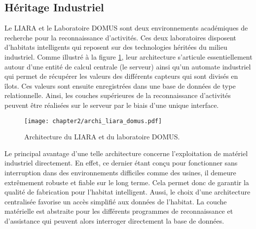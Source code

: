 \subsection{Héritage Industriel}

Le \acs{LIARA} \citep{Bouchard2014} et le Laboratoire \acs{DOMUS} \citep{Giroux2009} sont deux environnements académiques de recherche pour la reconnaissance d'activités. Ces deux laboratoires disposent d'habitats intelligents qui reposent sur des technologies héritées du milieu industriel. Comme illustré à la figure \ref{fig:archi_liara_domus}, leur architecture s'articule essentiellement autour d'une entité de calcul centrale (le serveur) ainsi qu'un automate industriel qui permet de récupérer les valeurs des différents capteurs qui sont divisés en îlots. Ces valeurs sont ensuite enregistrées dans une base de données de type relationnelle. Ainsi, les couches supérieures de la reconnaissance d'activités peuvent être réalisées sur le serveur par le biais d'une unique interface.

\begin{figure}[t]
	\centering
	\texttt{[image: chapter2/archi\_liara\_domus.pdf]}
	\caption{Architecture du \acs{LIARA} et du laboratoire \acs{DOMUS}.}
	\label{fig:archi_liara_domus}
\end{figure}

Le principal avantage d'une telle architecture concerne l'exploitation de matériel industriel directement. En effet, ce dernier étant conçu pour fonctionner sans interruption dans des environnements difficiles comme des usines, il demeure extrêmement robuste et fiable sur le long terme. Cela permet donc de garantir la qualité de fabrication pour l'habitat intelligent. Aussi, le choix d'une architecture centralisée favorise un accès simplifié aux données de l'habitat. La couche matérielle est abstraite pour les différents programmes de reconnaissance et d'assistance qui peuvent alors interroger directement la base de données.

